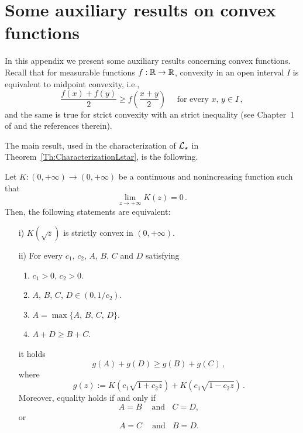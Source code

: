 \section{Some auxiliary results on convex functions}
\label{Sec:AuxiliaryResults}

In this appendix we present some auxiliary results concerning convex functions. Recall that for measurable functions $f:\mathbb{R}\to \mathbb{R}$, convexity in an open interval $I$ is equivalent to midpoint convexity, i.e.,
$$
\dfrac{f(x) + f(y)}{2} \geq f \left( \dfrac{x+y}{2}\right) \quad \textrm{ for every } x,\, y \in I\,,
$$
and the same is true for strict convexity with an strict inequality
(see Chapter~1 of \cite{Niculescu} and the references therein).


The main result, used in the characterization of $\mathcal{L}_\star$ in Theorem~\ref{Th:CharacterizationLstar}, is the following.

\begin{proposition}
	\label{Prop:EquivalenceK(sqrt)Convex<->Inequality}
	Let $K:(0, +\infty) \to (0,+\infty)$ be a continuous and nonincreasing function such that
	$$
	\lim_{z\to +\infty} K(z) = 0\,.
	$$
	Then, the following statements are equivalent:
	\begin{enumerate}
		\item[i)] $K(\sqrt{z})$ is strictly convex in $(0, +\infty)$.
		\item[ii)] For every $c_1$, $c_2$, $A$, $B$, $C$ and $D$ satisfying
		\begin{enumerate}
			\item $c_1 > 0$, $c_2>0$.
			\item $A$, $B$, $C$, $D \in (0, 1/c_2)$.
			\item $A = \max\{A,\, B,\, C,\, D\}$.
			\item $A + D \geq B + C$.
		\end{enumerate}
		it holds
		$$
		g(A) + g(D) \geq g(B) + g(C)\,,
		$$
		where
		$$
		g(z) := K(c_1 \sqrt{1 + c_2z}) + K(c_1 \sqrt{1 - c_2z})\,.
		$$
		Moreover, equality holds if and only if
		$$ A = B \ \ \ \ \textrm{ and} \ \ \ \ C=D, $$
		or
		$$ A = C \ \ \ \ \textrm{ and} \ \ \ \ B=D. $$
	\end{enumerate}
\end{proposition}



